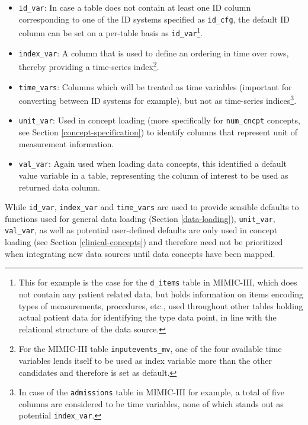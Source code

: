 \documentclass[
]{jss}
\providecommand{\tightlist}{%
  \setlength{\itemsep}{0pt}\setlength{\parskip}{0pt}}
\begin{document}
\begin{itemize}
\tightlist
\item
  \texttt{id\_var}: In case a table does not contain at least one ID
  column corresponding to one of the ID systems specified as
  \texttt{id\_cfg}, the default ID column can be set on a per-table
  basis as \texttt{id\_var}\footnote{This for example is the case for
    the \texttt{d\_items} table in MIMIC-III, which does not contain any
    patient related data, but holds information on items encoding types
    of measurements, procedures, etc., used throughout other tables
    holding actual patient data for identifying the type data point, in
    line with the relational structure of the data source.}.
\item
  \texttt{index\_var}: A column that is used to define an ordering in
  time over rows, thereby providing a time-series index\footnote{For the
    MIMIC-III table \texttt{inputevents\_mv}, one of the four available
    time variables lends itself to be used as index variable more than
    the other candidates and therefore is set as default.}.
\item
  \texttt{time\_vars}: Columns which will be treated as time variables
  (important for converting between ID systems for example), but not as
  time-series indices\footnote{In case of the \texttt{admissions} table
    in MIMIC-III for example, a total of five columns are considered to
    be time variables, none of which stands out as potential
    \texttt{index\_var}.}.
\item
  \texttt{unit\_var}: Used in concept loading (more specifically for
  \texttt{num\_cncpt} concepts, see Section \ref{concept-specification})
  to identify columns that represent unit of measurement information.
\item
  \texttt{val\_var}: Again used when loading data concepts, this
  identified a default value variable in a table, representing the
  column of interest to be used as returned data column.
\end{itemize}

While \texttt{id\_var}, \texttt{index\_var} and \texttt{time\_vars} are
used to provide sensible defaults to functions used for general data
loading (Section \ref{data-loading}), \texttt{unit\_var},
\texttt{val\_var}, as well as potential user-defined defaults are only
used in concept loading (see Section \ref{clinical-concepts}) and
therefore need not be prioritized when integrating new data sources
until data concepts have been mapped.
\end{document}
